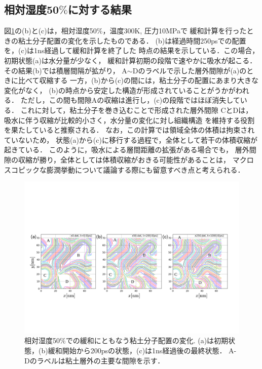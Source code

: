 \subsection{相対湿度50$\%$に対する結果}
図\ref{fig:fig3}の(b)と(c)は，相対湿度50$\%$，温度300K, 圧力10MPaで
緩和計算を行ったときの粘土分子配置の変化を示したものである．
(b)は経過時間250psでの配置を，(c)は1ns経過して緩和計算を終了した
時点の結果を示している．この場合，初期状態(a)は水分量が少なく，
緩和計算初期の段階で速やかに吸水が起こる．その結果(b)では積層間隔が拡がり，
A$\sim$Dのラベルで示した層外間隙が(a)のときに比べて収縮する
一方，(b)から(c)の間には，粘土分子の配置にあまり大きな変化がなく，
(b)の時点から安定した構造が形成されていることがうかがわれる．
ただし，この間も間隙Aの収縮は進行し，(c)の段階ではほぼ消失している．
これに対して，粘土分子を巻き込むことで形成された層外間隙
CとDは，吸水に伴う収縮が比較的小さく，水分量の変化に対し組織構造
を維持する役割を果たしていると推察される．
なお，この計算では領域全体の体積は拘束されていないため，
状態(a)から(c)に移行する過程で，全体として若干の体積収縮が起きている．
このように，吸水による層間距離の拡張がある場合でも，
層外間隙の収縮が勝り，全体としては体積収縮がおきる可能性があることは，
マクロスコピックな膨潤挙動について議論する際にも留意すべき点と考えられる．
\begin{figure}[t]
	\begin{center}
	\includegraphics[width=1.0\linewidth]{Figs/fig3.pdf} 
	\end{center}
	\caption{
		相対湿度50$\%$での緩和にともなう粘土分子配置の変化.  
		(a)は初期状態，(b)緩和開始から200psの状態，(c)は1ns経過後の最終状態．
		A-Dのラベルは粘土層外の主要な間隙を示す．
	} 
	\label{fig:fig3}
\end{figure}
